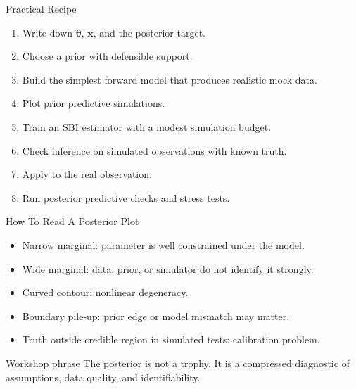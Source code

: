 \documentclass[aspectratio=169,11pt]{beamer}
\newcommand{\tightlist}{\setlength{\itemsep}{0.35em}}
\begin{document}
\begin{frame}{Practical Recipe}
  \begin{enumerate}
    \item Write down $\bm{\theta}$, $\bm{x}$, and the posterior target.
    \item Choose a prior with defensible support.
    \item Build the simplest forward model that produces realistic mock data.
    \item Plot prior predictive simulations.
    \item Train an SBI estimator with a modest simulation budget.
    \item Check inference on simulated observations with known truth.
    \item Apply to the real observation.
    \item Run posterior predictive checks and stress tests.
  \end{enumerate}
\end{frame}

\begin{frame}{How To Read A Posterior Plot}
  \begin{itemize}\tightlist
    \item Narrow marginal: parameter is well constrained under the model.
    \item Wide marginal: data, prior, or simulator do not identify it strongly.
    \item Curved contour: nonlinear degeneracy.
    \item Boundary pile-up: prior edge or model mismatch may matter.
    \item Truth outside credible region in simulated tests: calibration problem.
  \end{itemize}

  \vspace{0.35cm}
  \begin{block}{Workshop phrase}
    The posterior is not a trophy. It is a compressed diagnostic of assumptions,
    data quality, and identifiability.
  \end{block}
\end{frame}
\end{document}

